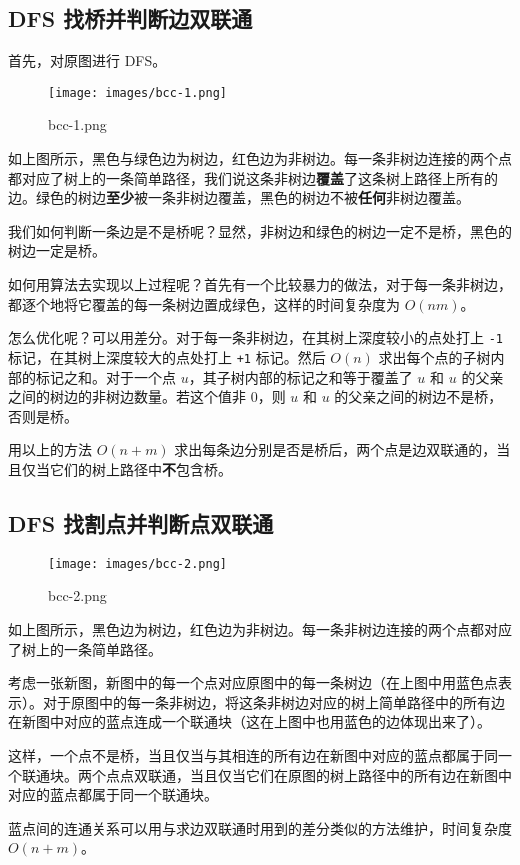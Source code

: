 \subsection{DFS 找桥并判断边双联通}

首先，对原图进行 DFS。

\begin{figure}[h]
\centering
\texttt{[image: images/bcc-1.png]} 
\caption{bcc-1.png}
\end{figure}

如上图所示，黑色与绿色边为树边，红色边为非树边。每一条非树边连接的两个点都对应了树上的一条简单路径，我们说这条非树边\textbf{覆盖}了这条树上路径上所有的边。绿色的树边\textbf{至少}被一条非树边覆盖，黑色的树边不被\textbf{任何}非树边覆盖。

我们如何判断一条边是不是桥呢？显然，非树边和绿色的树边一定不是桥，黑色的树边一定是桥。

如何用算法去实现以上过程呢？首先有一个比较暴力的做法，对于每一条非树边，都逐个地将它覆盖的每一条树边置成绿色，这样的时间复杂度为 $O(nm)$。

怎么优化呢？可以用差分。对于每一条非树边，在其树上深度较小的点处打上 \texttt{-1} 标记，在其树上深度较大的点处打上 \texttt{+1} 标记。然后 $O(n)$ 求出每个点的子树内部的标记之和。对于一个点 $u$，其子树内部的标记之和等于覆盖了 $u$ 和 $u$ 的父亲之间的树边的非树边数量。若这个值非 $0$，则 $u$ 和 $u$ 的父亲之间的树边不是桥，否则是桥。

用以上的方法 $O(n+m)$ 求出每条边分别是否是桥后，两个点是边双联通的，当且仅当它们的树上路径中\textbf{不}包含桥。

\subsection{DFS 找割点并判断点双联通}

\begin{figure}[h]
\centering
\texttt{[image: images/bcc-2.png]} 
\caption{bcc-2.png}
\end{figure}

如上图所示，黑色边为树边，红色边为非树边。每一条非树边连接的两个点都对应了树上的一条简单路径。

考虑一张新图，新图中的每一个点对应原图中的每一条树边（在上图中用蓝色点表示）。对于原图中的每一条非树边，将这条非树边对应的树上简单路径中的所有边在新图中对应的蓝点连成一个联通块（这在上图中也用蓝色的边体现出来了）。

这样，一个点不是桥，当且仅当与其相连的所有边在新图中对应的蓝点都属于同一个联通块。两个点点双联通，当且仅当它们在原图的树上路径中的所有边在新图中对应的蓝点都属于同一个联通块。

蓝点间的连通关系可以用与求边双联通时用到的差分类似的方法维护，时间复杂度 $O(n+m)$。
